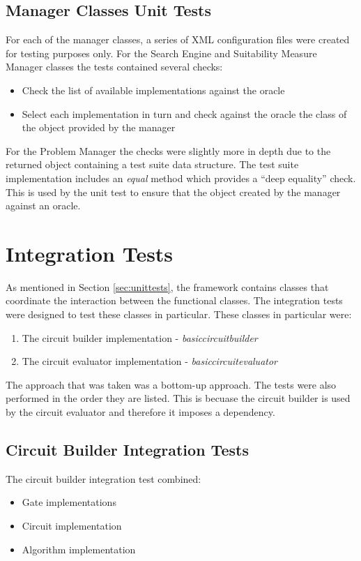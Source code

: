 \subsection{Manager Classes Unit Tests}
\label{sec:manclasstests}
For each of the manager classes, a series of XML configuration files were created for testing purposes only.
For the Search Engine and Suitability Measure Manager classes the tests contained several checks:
\begin{itemize}
 \item Check the list of available implementations against the oracle
 \item Select each implementation in turn and check against the oracle the class of the object provided by the manager
\end{itemize}

For the Problem Manager the checks were slightly more in depth due to the returned object containing a test suite data structure.
The test suite implementation includes an \emph{equal} method which provides a ``deep equality'' check.
This is used by the unit test to ensure that the object created by the manager against an oracle.

\section{Integration Tests}
As mentioned in Section \ref{sec:unittests}, the framework contains classes that coordinate the interaction between the functional classes.
The integration tests were designed to test these classes in particular.
These classes in particular were:
\begin{enumerate}
 \item The circuit builder implementation - \emph{basiccircuitbuilder}
 \item The circuit evaluator implementation - \emph{basiccircuitevaluator}
\end{enumerate}

The approach that was taken was a bottom-up approach.
The tests were also performed in the order they are listed.
This is becuase the circuit builder is used by the circuit evaluator and therefore it imposes a dependency.

\subsection{Circuit Builder Integration Tests}
The circuit builder integration test combined:
\begin{itemize}
 \item Gate implementations
 \item Circuit implementation
 \item Algorithm implementation
\end{itemize}


